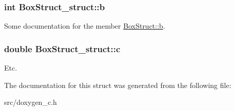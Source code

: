 \subsubsection[{b}]{\setlength{\rightskip}{0pt plus 5cm}int Box\+Struct\+\_\+struct\+::b}\label{structBoxStruct__struct_aee44748dc579c5d794853ee8b133d197}
Some documentation for the member \hyperlink{structBoxStruct__struct_aee44748dc579c5d794853ee8b133d197}{Box\+Struct\+::b}. \hypertarget{structBoxStruct__struct_a4543370ed67b2cf5ae3f55201bea11e6}{}
\subsubsection[{c}]{\setlength{\rightskip}{0pt plus 5cm}double Box\+Struct\+\_\+struct\+::c}\label{structBoxStruct__struct_a4543370ed67b2cf5ae3f55201bea11e6}
Etc. 

The documentation for this struct was generated from the following file\+:\begin{DoxyCompactItemize}
\item 
src/doxygen\+\_\+c.\+h\end{DoxyCompactItemize}
